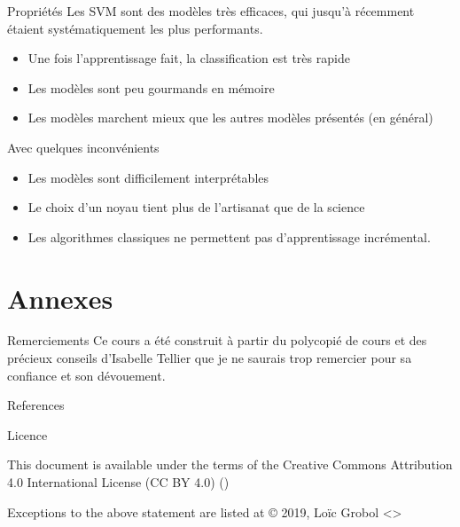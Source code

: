 \documentclass[hyperref={unicode}, xcolor={svgnames}, french]{beamer}
\begin{document}
\begin{frame}{Propriétés}
    Les SVM sont des modèles très efficaces, qui jusqu'à récemment étaient systématiquement les plus performants.
    \begin{itemize}
        \item Une fois l'apprentissage fait, la classification est très rapide
        \item Les modèles sont peu gourmands en mémoire
        \item Les modèles marchent mieux que les autres modèles présentés (en général)
    \end{itemize}
    Avec quelques inconvénients
    \begin{itemize}
        \item Les modèles sont difficilement interprétables
        \item Le choix d'un noyau tient plus de l'artisanat que de la science
        \item Les algorithmes classiques ne permettent pas d'apprentissage incrémental.
    \end{itemize}
\end{frame}


\appendix
{}  %
\section{Annexes}
\begin{frame}{Remerciements}
    Ce cours a été construit à partir du polycopié de cours  \parencite{tellier2017fouille} et des précieux conseils d'Isabelle Tellier que je ne saurais trop remercier pour sa confiance et son dévouement.
\end{frame}

\begin{frame}[allowframebreaks]{References}
    \printbibliography[heading=none]
\end{frame}

\begin{frame}{Licence}
    \begin{center}
        {\huge \ccby}
        \vfill
        This document is available under the terms of the Creative Commons Attribution 4.0 International License (CC BY 4.0) ()

        Exceptions to the above statement are listed at {\small{}}
        \vfill
        © 2019, Loïc Grobol <>

    \end{center}
\end{frame}
\end{document}
